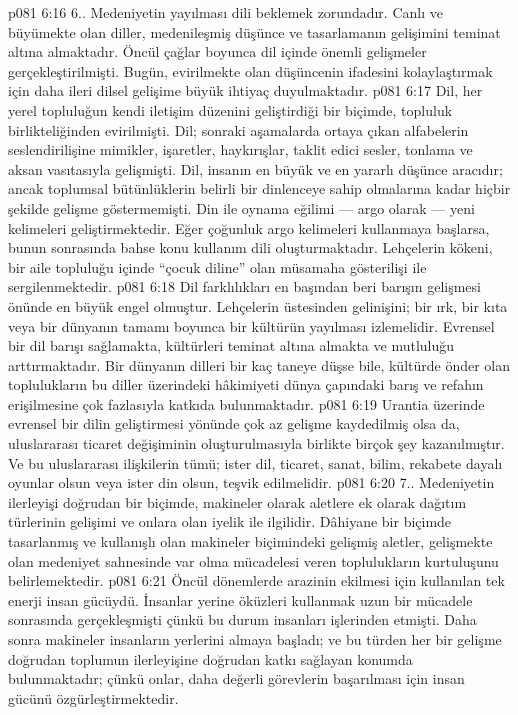 \vs p081 6:16 6.\bibnobreakspace {}. Medeniyetin yayılması dili beklemek zorundadır. Canlı ve büyümekte olan diller, medenileşmiş düşünce ve tasarlamanın gelişimini teminat altına almaktadır. Öncül çağlar boyunca dil içinde önemli gelişmeler gerçekleştirilmişti. Bugün, evirilmekte olan düşüncenin ifadesini kolaylaştırmak için daha ileri dilsel gelişime büyük ihtiyaç duyulmaktadır.
\vs p081 6:17 Dil, her yerel topluluğun kendi iletişim düzenini geliştirdiği bir biçimde, topluluk birlikteliğinden evirilmişti. Dil; sonraki aşamalarda ortaya çıkan alfabelerin seslendirilişine mimikler, işaretler, haykırışlar, taklit edici sesler, tonlama ve aksan vasıtasıyla gelişmişti. Dil, insanın en büyük ve en yararlı düşünce aracıdır; ancak toplumsal bütünlüklerin belirli bir dinlenceye sahip olmalarına kadar hiçbir şekilde gelişme göstermemişti. Din ile oynama eğilimi --- argo olarak --- yeni kelimeleri geliştirmektedir. Eğer çoğunluk argo kelimeleri kullanmaya başlarsa, bunun sonrasında bahse konu kullanım dili oluşturmaktadır. Lehçelerin kökeni, bir aile topluluğu içinde “çocuk diline” olan müsamaha gösterilişi ile sergilenmektedir.
\vs p081 6:18 Dil farklılıkları en başından beri barışın gelişmesi önünde en büyük engel olmuştur. Lehçelerin üstesinden gelinişini; bir ırk, bir kıta veya bir dünyanın tamamı boyunca bir kültürün yayılması izlemelidir. Evrensel bir dil barışı sağlamakta, kültürleri teminat altına almakta ve mutluluğu arttırmaktadır. Bir dünyanın dilleri bir kaç taneye düşse bile, kültürde önder olan toplulukların bu diller üzerindeki hâkimiyeti dünya çapındaki barış ve refahın erişilmesine çok fazlasıyla katkıda bulunmaktadır.
\vs p081 6:19 Urantia üzerinde evrensel bir dilin geliştirmesi yönünde çok az gelişme kaydedilmiş olsa da, uluslararası ticaret değişiminin oluşturulmasıyla birlikte birçok şey kazanılmıştır. Ve bu uluslararası ilişkilerin tümü; ister dil, ticaret, sanat, bilim, rekabete dayalı oyunlar olsun veya ister din olsun, teşvik edilmelidir.
\vs p081 6:20 7.\bibnobreakspace {}. Medeniyetin ilerleyişi doğrudan bir biçimde, makineler olarak aletlere ek olarak dağıtım türlerinin gelişimi ve onlara olan iyelik ile ilgilidir. Dâhiyane bir biçimde tasarlanmış ve kullanışlı olan makineler biçimindeki gelişmiş aletler, gelişmekte olan medeniyet sahnesinde var olma mücadelesi veren toplulukların kurtuluşunu belirlemektedir.
\vs p081 6:21 Öncül dönemlerde arazinin ekilmesi için kullanılan tek enerji insan gücüydü. İnsanlar yerine öküzleri kullanmak uzun bir mücadele sonrasında gerçekleşmişti çünkü bu durum insanları işlerinden etmişti. Daha sonra makineler insanların yerlerini almaya başladı; ve bu türden her bir gelişme doğrudan toplumun ilerleyişine doğrudan katkı sağlayan konumda bulunmaktadır; çünkü onlar, daha değerli görevlerin başarılması için insan gücünü özgürleştirmektedir.
